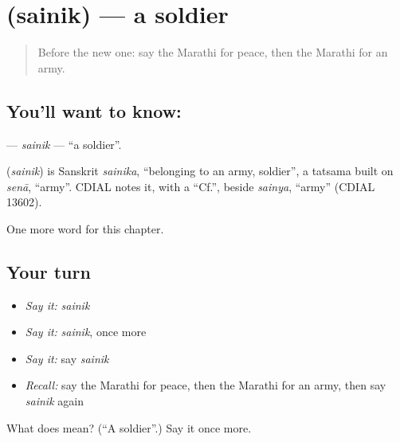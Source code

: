 \section[\texorpdfstring{\mr{सैनिक} (sainik)}{सैनिक (sainik)}]{ (sainik) — a soldier}

\label{lesson:MR-C209-sainik}



\begin{quote}
Before the new one: say the Marathi for peace, then the Marathi for an army.
\end{quote}

\subsection*{You'll want to know: }
\textbf{} — \emph{sainik} — \textquotedblleft{}a soldier\textquotedblright{}.

\begin{cousinweb}
\textbf{} (\emph{sainik}) is Sanskrit \emph{sainika}, \textquotedblleft{}belonging to an army, soldier\textquotedblright{}, a tatsama built on \emph{senā}, \textquotedblleft{}army\textquotedblright{}. CDIAL notes it, with a \textquotedblleft{}Cf.\textquotedblright{}, beside \emph{sainya}, \textquotedblleft{}army\textquotedblright{} (CDIAL 13602).
\end{cousinweb}

\begin{grammarlens}[title={What you've built}]
One more word for this chapter.
\end{grammarlens}

\subsection*{Your turn}
\begin{itemize}
\raggedright
  \item \emph{Say it:} \emph{sainik}
  \item \emph{Say it:} \emph{sainik}, once more
  \item \emph{Say it:} say \emph{sainik}
  \item \emph{Recall:} say the Marathi for peace, then the Marathi for an army, then say \emph{sainik} again
\end{itemize}

\begin{tcolorbox}[breakable,colback=teal!4,colframe=teal!35!black,title={Before you move on}]
What does  mean? (\textquotedblleft{}A soldier\textquotedblright{}.) Say it once more.
\end{tcolorbox}
